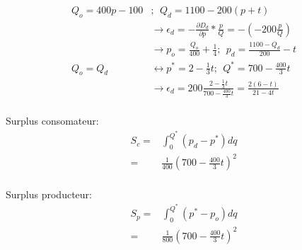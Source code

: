 \documentclass[12pt]{report}
\numberwithin{equation}{section}
\begin{document}
\begin{align*}
Q_o = 400p-100&; ~~Q_d = 1100-200(p+t) \\
&\rightarrow \epsilon_d = -\frac{\partial D_d}{\partial p}*\frac{p}{Q}=-(-200 \frac{p}{Q}) \\
&\rightarrow 
p_o = \frac{Q_o}{400} + \frac{1}{4} ; ~~p_d = \frac{1100-Q_d}{200}-t  \\
Q_o = Q_d 
&\leftrightarrow p^* = 2 - \frac{1}{3}t; ~~ Q^*=700 - \frac{400}{3}t \\ 
&\rightarrow \epsilon_d = 200 \frac{2 - \frac{1}{3}t}{700 - \frac{400}{3}t} = \frac{2(6-t)}{21-4t} \\
\end{align*}

Surplus consomateur:
\begin{align*}
S_c = &\int^{Q^*}_{0} (p_d - p^*)dq \\
= &\frac{1}{400} \left(700 - \frac{400}{3}t \right)^2   \\
\end{align*}

Surplus producteur:
\begin{align*}
S_p = &\int^{Q^*}_{0} (p^* - p_o)dq \\
= & \frac{1}{800} \left( 700 - \frac{400}{3}t \right)^2 \\
\end{align*}
\end{document}
